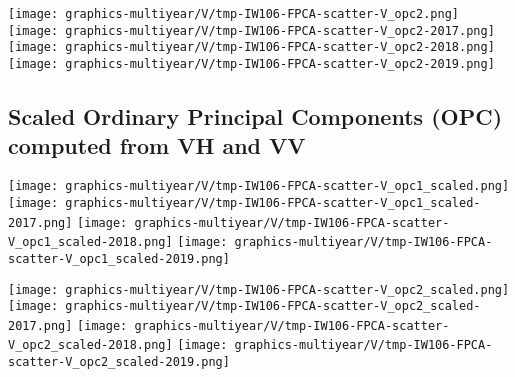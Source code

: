 \clearpage
\begin{center}
\begin{minipage}{7.0in}
\texttt{[image: graphics-multiyear/V/tmp-IW106-FPCA-scatter-V\_opc2.png]}
\quad
\texttt{[image: graphics-multiyear/V/tmp-IW106-FPCA-scatter-V\_opc2-2017.png]}
\vskip 1.0cm
\texttt{[image: graphics-multiyear/V/tmp-IW106-FPCA-scatter-V\_opc2-2018.png]}
\quad
\texttt{[image: graphics-multiyear/V/tmp-IW106-FPCA-scatter-V\_opc2-2019.png]}
\end{minipage}
\end{center}


\clearpage

\subsection{Scaled Ordinary Principal Components (OPC) computed from VH and VV}
\label{FPCA-scatter-opc-scaled-IW106}

\begin{center}
\begin{minipage}{7.0in}
\texttt{[image: graphics-multiyear/V/tmp-IW106-FPCA-scatter-V\_opc1\_scaled.png]}
\quad
\texttt{[image: graphics-multiyear/V/tmp-IW106-FPCA-scatter-V\_opc1\_scaled-2017.png]}
\vskip 1.0cm
\texttt{[image: graphics-multiyear/V/tmp-IW106-FPCA-scatter-V\_opc1\_scaled-2018.png]}
\quad
\texttt{[image: graphics-multiyear/V/tmp-IW106-FPCA-scatter-V\_opc1\_scaled-2019.png]}
\end{minipage}
\end{center}


\clearpage
\begin{center}
\begin{minipage}{7.0in}
\texttt{[image: graphics-multiyear/V/tmp-IW106-FPCA-scatter-V\_opc2\_scaled.png]}
\quad
\texttt{[image: graphics-multiyear/V/tmp-IW106-FPCA-scatter-V\_opc2\_scaled-2017.png]}
\vskip 1.0cm
\texttt{[image: graphics-multiyear/V/tmp-IW106-FPCA-scatter-V\_opc2\_scaled-2018.png]}
\quad
\texttt{[image: graphics-multiyear/V/tmp-IW106-FPCA-scatter-V\_opc2\_scaled-2019.png]}
\end{minipage}
\end{center}


\renewcommand{\theenumi}{\roman{enumi}}
\renewcommand{\labelenumi}{\textnormal{(\theenumi)}$\;\;$}

